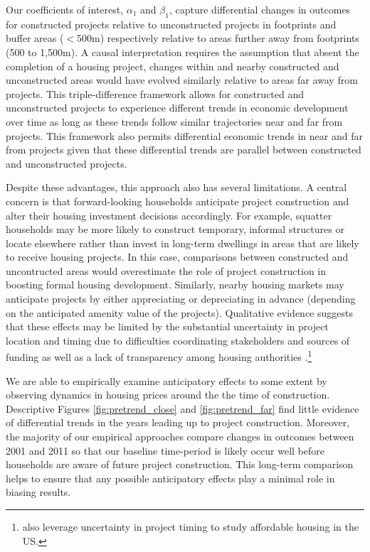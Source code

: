 \documentclass[12pt]{article}
\begin{document}
Our coefficients of interest, $\alpha_1$ and $\beta_1$, capture differential changes in outcomes for constructed projects relative to unconstructed projects in footprints and buffer areas ($<$500m) respectively relative to areas further away from footprints (500 to 1,500m).  A causal interpretation requires the assumption that absent the completion of a housing project, changes within and nearby constructed and unconstructed areas would have evolved similarly relative to areas far away from projects.  This triple-difference framework allows for constructed and unconstructed projects to experience different trends in economic development over time as long as these trends follow similar trajectories near and far from projects.  This framework also permits differential economic trends in near and far from projects given that these differential trends are parallel between constructed and unconstructed projects.

Despite these advantages, this approach also has several limitations.  A central concern is that forward-looking households anticipate project construction and alter their housing investment decisions accordingly.  For example, squatter households may be more likely to construct temporary, informal structures or locate elsewhere rather than invest in long-term dwellings in areas that are likely to receive housing projects.  In this case, comparisons between constructed and uncontructed areas would overestimate the role of project construction in boosting formal housing development.  Similarly, nearby housing markets may anticipate projects by either appreciating or depreciating in advance (depending on the anticipated amenity value of the projects).  Qualitative evidence suggests that these effects may be limited by the substantial uncertainty in project location and timing due to difficulties coordinating stakeholders and sources of funding as well as a lack of transparency among housing authorities \citep{serihistory}.\footnote{\cite{diamond2016wants} also leverage uncertainty in project timing to study affordable housing in the US.} 

We are able to empirically examine anticipatory effects to some extent by observing dynamics in housing prices around the the time of construction.  Descriptive Figures \ref{fig:pretrend_close} and \ref{fig:pretrend_far} find little evidence of differential trends in the years leading up to project construction.   Moreover, the majority of our empirical approaches compare changes in outcomes between 2001 and 2011 so that our baseline time-period is likely occur well before households are aware of future project construction.  This long-term comparison helps to ensure that any possible anticipatory effects play a minimal role in biasing results.  
\end{document}
